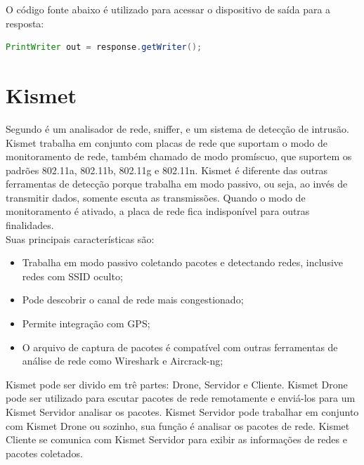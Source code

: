 O código fonte abaixo é utilizado para acessar o dispositivo de saída para a resposta:

\begin{lstlisting}[language=Java,caption={Acessando dispositivo de saída}]
PrintWriter out = response.getWriter();
\end{lstlisting}

\section{Kismet}
\label{sec:kismet}

Segundo \cite{Kershaw} é um analisador de rede, sniffer, e um sistema de detecção de intrusão. Kismet trabalha em conjunto com placas de rede que suportam o modo de monitoramento de rede, também chamado de modo promíscuo, que suportem os padrões 802.11a, 802.11b, 802.11g e 802.11n. Kismet é diferente das outras ferramentas de detecção porque trabalha em modo passivo, ou seja, ao invés de transmitir dados, somente escuta as transmissões. Quando o modo de monitoramento é ativado, a placa de rede fica indisponível para outras finalidades.\\
\indent Suas principais características são:

\begin{itemize}
	\item Trabalha em modo passivo coletando pacotes e detectando redes, inclusive redes com SSID oculto;
	\item Pode descobrir o canal de rede mais congestionado;
	\item Permite integração com GPS;
	\item O arquivo de captura de pacotes é compatível com outras ferramentas de análise de rede como Wireshark e Aircrack-ng;  
\end{itemize}

Kismet pode ser divido em trê partes: Drone, Servidor e Cliente. Kismet Drone pode ser utilizado para escutar pacotes de rede remotamente e enviá-los para um Kismet Servidor analisar os pacotes. Kismet Servidor pode trabalhar em conjunto com Kismet Drone ou sozinho, sua função é analisar os pacotes de rede. Kismet Cliente se comunica com Kismet Servidor para exibir as informações de redes e pacotes coletados.